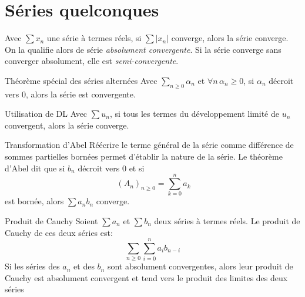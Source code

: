 \documentclass[french, a4paper, 11pt, twocolumn]{article}
\newcommand{\po}{\left(}         %
\newcommand{\pf}{\right)}        %
\newcommand{\pof}[1]{\po #1 \pf} %
\begin{document}
\section{Séries quelconques}
\begin{definition}
  Avec $\sum x_{n}$ une série à termes  réels, si $\sum\left| x_{n}\right|$ converge, alors la série converge. On la qualifie alors de série \emph{absolument convergente}. Si la série converge sans converger absolument, elle est \emph{semi-convergente}.
\end{definition}

\begin{theoreme}{Théorème spécial des séries alternées}
  Avec $\sum_{n\geqslant 0} \alpha_{n}$ et $\forall n\, \alpha_{n}\geqslant 0$,
  si $\alpha_{n}$ décroit vers $0$, alors la série est convergente.
\end{theoreme}

\begin{theoreme}{Utilisation de DL}
  Avec $\sum u_{n}$, si tous les termes du développement limité de $u_{n}$ convergent, alors la série converge.
\end{theoreme}

\begin{theoreme}{Transformation d'Abel}
  Réécrire le terme général de la série comme différence de sommes partielles bornées permet d'établir la nature de la série.
  \tcblower
  Le théorème d'Abel dit que si $b_{n}$ décroit vers $0$ et si \[\ \pof{A_{n}}_{n\geqslant 0}=\sum_{k=0}^n a_k\] est bornée, alors $\sum a_{n}b_{n}$ converge.
\end{theoreme}

\begin{theoreme}{Produit de Cauchy}
  Soient $\sum a_{n}$ et $\sum b_{n}$ deux séries à termes réels. Le produit de Cauchy de ces deux séries est:
  \[\sum_{n\geqslant 0}\sum_{i=0}^{n}a_{i}b_{n-i}\]
  Si les séries des $a_{n}$ et des $b_{n}$ sont absolument convergentes, alors leur produit de Cauchy est absolument convergent et tend vers le produit des limites des deux séries
\end{theoreme}
\end{document}
